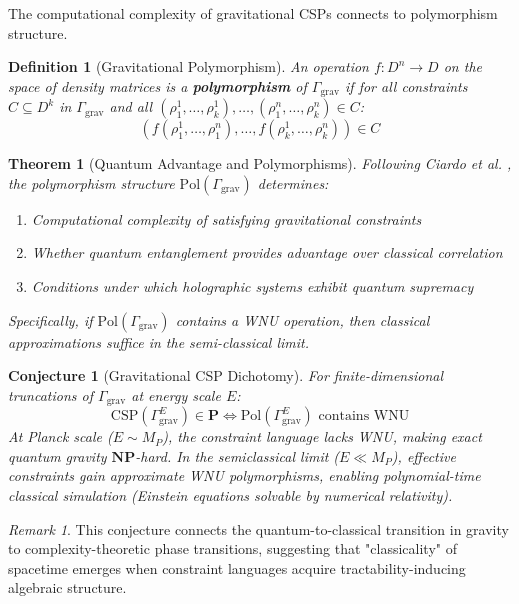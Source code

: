 \documentclass[11pt,a4paper]{article}
\newtheorem{theorem}{Theorem}[section]
\newtheorem{definition}{Definition}[section]
\newtheorem{conjecture}{Conjecture}[section]
\theoremstyle{remark}
\newtheorem{remark}{Remark}[section]
\theoremstyle{definition}
\begin{document}
The computational complexity of gravitational CSPs connects to polymorphism structure.

\begin{definition}[Gravitational Polymorphism]
An operation $f: D^n \to D$ on the space of density matrices is a \textbf{polymorphism} of $\Gamma_{\text{grav}}$ if for all constraints $C \subseteq D^k$ in $\Gamma_{\text{grav}}$ and all $(\rho_1^1, \ldots, \rho_k^1), \ldots, (\rho_1^n, \ldots, \rho_k^n) \in C$:
\begin{equation}
\left(f(\rho_1^1, \ldots, \rho_1^n), \ldots, f(\rho_k^1, \ldots, \rho_k^n)\right) \in C
\end{equation}
\end{definition}

\begin{theorem}[Quantum Advantage and Polymorphisms]
\label{thm:quantum_advantage_polymorphisms}
Following Ciardo et al. \cite{Ciardo2024}, the polymorphism structure $\text{Pol}(\Gamma_{\text{grav}})$ determines:
\begin{enumerate}[label=(\roman*)]
\item Computational complexity of satisfying gravitational constraints
\item Whether quantum entanglement provides advantage over classical correlation
\item Conditions under which holographic systems exhibit quantum supremacy
\end{enumerate}
Specifically, if $\text{Pol}(\Gamma_{\text{grav}})$ contains a WNU operation, then classical approximations suffice in the semi-classical limit.
\end{theorem}

\begin{conjecture}[Gravitational CSP Dichotomy]
\label{conj:grav_dichotomy}
For finite-dimensional truncations of $\Gamma_{\text{grav}}$ at energy scale $E$:
\begin{equation}
\text{CSP}(\Gamma_{\text{grav}}^E) \in \mathbf{P} \iff \text{Pol}(\Gamma_{\text{grav}}^E) \text{ contains WNU}
\end{equation}
At Planck scale ($E \sim M_P$), the constraint language lacks WNU, making exact quantum gravity $\mathbf{NP}$-hard. In the semiclassical limit ($E \ll M_P$), effective constraints gain approximate WNU polymorphisms, enabling polynomial-time classical simulation (Einstein equations solvable by numerical relativity).
\end{conjecture}

\begin{remark}
This conjecture connects the quantum-to-classical transition in gravity to complexity-theoretic phase transitions, suggesting that "classicality" of spacetime emerges when constraint languages acquire tractability-inducing algebraic structure.
\end{remark}
\end{document}

